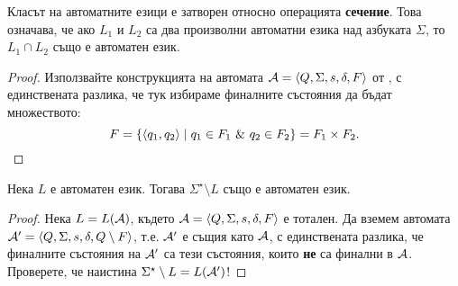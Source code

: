 \begin{cor}
  Класът на автоматните езици е затворен относно операцията {\bf сечение}.
  Това означава, че ако $L_1$ и $L_2$ са два произволни автоматни езика над азбуката $\Sigma$, то $L_1\cap L_2$
  също е автоматен език.
\end{cor}
\begin{proof}
  Използвайте конструкцията на автомата $\mathcal{A} = \langle{Q,\Sigma,s,\delta,F}\rangle$ от ,
  с единствената разлика, че тук избираме финалните състояния да бъдат множеството:
  \[F = \{\pair{q_1,q_2} \mid q_1 \in F_1\ \&\ q_2 \in F_2\} = F_1\times F_2.\]
\end{proof}

\begin{prop}
  Нека $L$ е автоматен език.
  Тогава $\Sigma^\star\setminus L$ също е автоматен език.
\end{prop}
\begin{proof}
  Нека $L = L(\mathcal{A})$, където $\mathcal{A} = \langle{Q,\Sigma,s,\delta,F}\rangle$ е тотален.
  Да вземем автомата $\mathcal{A}' = \langle{Q,\Sigma,s,\delta,Q\setminus F}\rangle$,
  т.е. $\mathcal{A}'$ е същия като $\mathcal{A}$, с единствената разлика, че финалните състояния на $\mathcal{A}'$
  са тези състояния, които {\bf не} са финални в $\mathcal{A}$.
  Проверете, че наистина $\Sigma^\star\setminus L = L(\mathcal{A}^\prime)$!
\end{proof}

